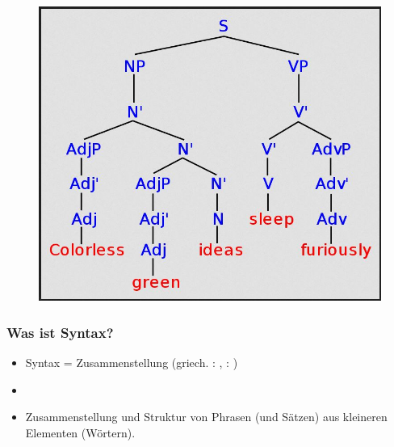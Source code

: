 \begin{frame}

\begin{figure}
\centering
	\includegraphics[scale=.3]{material/01colorless}
\end{figure}

\end{frame}


\begin{frame}
\frametitle{Was ist Syntax?}

\begin{itemize}
	\item Syntax = Zusammenstellung (griech. : , : )
	\item[]
	\item Zusammenstellung und Struktur von Phrasen (und Sätzen) aus kleineren Elementen (Wörtern).
\end{itemize}

\nocite{Roedel16a}

\end{frame}

